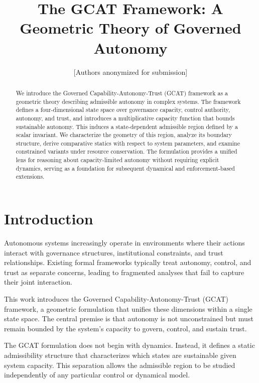 \documentclass[letterpaper, 10 pt, conference]{ieeeconf}
\title{\bf The GCAT Framework: A Geometric Theory of Governed Autonomy}
\author{[Authors anonymized for submission]}
\begin{document}
\maketitle
\thispagestyle{empty}
\pagestyle{empty}

\begin{abstract}
We introduce the Governed Capability-Autonomy-Trust (GCAT) framework as a geometric theory describing admissible autonomy in complex systems. The framework defines a four-dimensional state space over governance capacity, control authority, autonomy, and trust, and introduces a multiplicative capacity function that bounds sustainable autonomy. This induces a state-dependent admissible region defined by a scalar invariant. We characterize the geometry of this region, analyze its boundary structure, derive comparative statics with respect to system parameters, and examine constrained variants under resource conservation. The formulation provides a unified lens for reasoning about capacity-limited autonomy without requiring explicit dynamics, serving as a foundation for subsequent dynamical and enforcement-based extensions.
\end{abstract}

\section{Introduction}

Autonomous systems increasingly operate in environments where their actions interact with governance structures, institutional constraints, and trust relationships. Existing formal frameworks typically treat autonomy, control, and trust as separate concerns, leading to fragmented analyses that fail to capture their joint interaction.

This work introduces the Governed Capability-Autonomy-Trust (GCAT) framework, a geometric formulation that unifies these dimensions within a single state space. The central premise is that autonomy is not unconstrained but must remain bounded by the system’s capacity to govern, control, and sustain trust.

The GCAT formulation does not begin with dynamics. Instead, it defines a static admissibility structure that characterizes which states are sustainable given system capacity. This separation allows the admissible region to be studied independently of any particular control or dynamical model.
\end{document}
